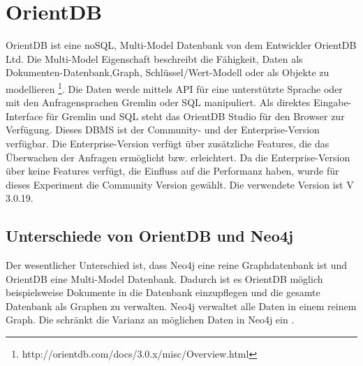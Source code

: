 \section{OrientDB}
OrientDB ist eine noSQL,  Multi-Model Datenbank von dem Entwickler OrientDB Ltd. Die Multi-Model Eigenschaft beschreibt die Fähigkeit, Daten als Dokumenten-Datenbank,Graph, Schlüssel/Wert-Modell oder als Objekte zu modellieren \footnote{http://orientdb.com/docs/3.0.x/misc/Overview.html}. Die Daten werde mittels API für eine unterstützte Sprache oder mit den Anfragensprachen Gremlin oder SQL manipuliert. Als direktes Eingabe-Interface für Gremlin und SQL steht das OrientDB Studio für den Browser zur Verfügung. Dieses DBMS ist der Community- und der Enterprise-Version verfügbar. Die Enterprise-Version verfügt über zusätzliche Features, die das Überwachen der Anfragen ermöglicht bzw. erleichtert. Da die Enterprise-Version über keine Features verfügt, die Einfluss auf die  Performanz haben, wurde für dieses Experiment die Community Version gewählt. Die verwendete Version ist V 3.0.19. 
\subsection{Unterschiede von OrientDB und Neo4j}
Der wesentlicher Unterschied ist, dass Neo4j eine reine Graphdatenbank ist und OrientDB eine Multi-Model Datenbank. Dadurch ist es OrientDB möglich beispielsweise Dokumente in die Datenbank einzupflegen und die gesamte Datenbank als Graphen zu verwalten. Neo4j verwaltet alle Daten in einem reinem Graph. Die schränkt die Varianz an möglichen Daten in Neo4j ein \parencite{fernandes2018graph}.
